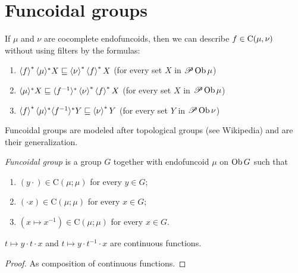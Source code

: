 \chapter{Funcoidal groups}

\begin{rem}
  If $\mu$ and $\nu$ are cocomplete endofuncoids, then we can describe $f \in
  \mathrm{C} (\mu,\nu)$ without using filters by the formulas:
  \begin{enumerate}
    \item $\left\langle f\right\rangle ^{\ast} \langle \mu \rangle^{\ast} X \sqsubseteq
    \left\langle \nu\right\rangle^{\ast} \left\langle f\right\rangle ^{\ast} X$ (for every set $X$
    in $\mathscr{P} \operatorname{Ob} \mu$)
    
    \item $\langle \mu \rangle^{\ast} X \sqsubseteq \langle f^{- 1}
    \rangle^{\ast} \left\langle \nu\right\rangle^{\ast} \left\langle f\right\rangle ^{\ast} X$ (for
    every set $X$ in $\mathscr{P} \operatorname{Ob} \mu$)
    
    \item $\left\langle f\right\rangle ^{\ast} \langle \mu \rangle^{\ast} \langle f^{- 1}
    \rangle^{\ast} Y \sqsubseteq \left\langle \nu\right\rangle^{\ast} Y$ (for every set
    $Y$ in $\mathscr{P} \operatorname{Ob} \nu$)
  \end{enumerate}
\end{rem}

Funcoidal groups are modeled after topological groups (see Wikipedia)
and are their generalization.

\begin{defn}
  \emph{Funcoidal group} is a group $G$ together with endofuncoid $\mu$ on
  $\operatorname{Ob} G$ such that
  \begin{enumerate}
    \item $(y \cdot) \in \mathrm{C} (\mu ; \mu)$ for every $y \in G$;
    
    \item $(\cdot x) \in \mathrm{C} (\mu ; \mu)$ for every $x \in G$;
    
    \item $(x \mapsto x^{- 1}) \in \mathrm{C} (\mu ; \mu)$ for every $x \in
    G$.
  \end{enumerate}
\end{defn}

\begin{prop}
  $t \mapsto y \cdot t \cdot x$ and $t \mapsto y \cdot t^{- 1} \cdot x$ are
  continuous functions.
\end{prop}

\begin{proof}
  As composition of continuous functions.
\end{proof}

